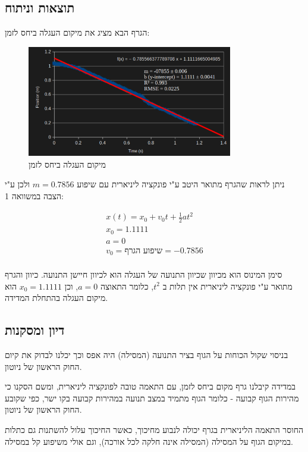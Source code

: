 \documentclass[14pt]{extarticle}
\begin{document}
\subsection*{תוצאות וניתוח}
הגרף הבא מציג את מיקום העגלה ביחס לזמן: 
\begin{figure}[H]
    \centering
    \includegraphics[width=0.8\textwidth]{maman_13_experiment_1_position_time_graph.png}
    \caption{מיקום העגלה ביחס לזמן}
\end{figure}

ניתן לראות שהגרף מתואר היטב ע"י פונקציה ליניארית עם שיפוע $m=0.7856$ ולכן ע"י הצבה במשוואה 1:
\begin{center}
\begin{equation}
\begin{aligned}
    x(t) = x_0 + v_0 t + \frac{1}{2} a t^2 \\
    x_0 = 1.1111 \\
    a = 0 \\
    v_0 = \textbf{שיפוע הגרף} = -0.7856 \\
\end{aligned}
\end{equation}
\end{center}
סימן המינוס הוא מכיוון שכיוון התנועה של העגלה הוא לכיוון חיישן התנועה.
כיוון והגרף מתואר ע"י פונקציה ליניארית אין תלות ב $t^2$, כלומר התאוצה $a=0$, וכן $x_0 = 1.1111$ הוא מיקום העגלה בהתחלת המדידה.

\subsection*{דיון ומסקנות}
בניסוי שקול הכוחות על הגוף בציר התנועה (המסילה) היה אפס וכך יכלנו לבדוק את קיום החוק הראשון של ניוטון.

במדידה קיבלנו גרף מקום ביחס לזמן, עם התאמה טובה לפונקציה ליניארית,  ומשם הסקנו כי מהירות הגוף קבועה - כלומר הגוף מתמיד במצב תנועה במהירות קבועה בקו ישר, כפי שקובע החוק הראשון של ניוטון.

החוסר התאמה הליניארית בגרף יכולה לנבוע מחיכוך, כאשר החיכוך עלול להשתנות גם כתלות במיקום הגוף על המסילה (המסילה אינה חלקה לכל אורכה), וגם אולי משיפוע קל במסילה.
\end{document}
